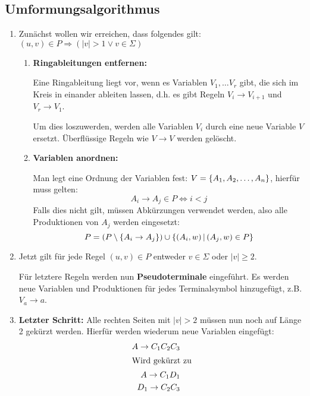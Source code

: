 \subsection{Umformungsalgorithmus}\label{cnf:algorithmus}
\begin{enumerate}
	\item Zunächst wollen wir erreichen, dass folgendes gilt: $(u,v)\in P\Rightarrow (|v|>1 \vee v\in \Sigma)$
	\begin{enumerate}
		\item \textbf{Ringableitungen entfernen:}

		Eine Ringableitung liegt vor, wenn es Variablen $V_1,\ldots V_r$ gibt, die sich im Kreis in einander ableiten lassen, d.h. es gibt Regeln $V_i\rightarrow V_{i+1}$ und $V_r\rightarrow V_1$.

		Um dies loszuwerden, werden alle Variablen $V_i$ durch eine neue Variable $V$ ersetzt. Überflüssige Regeln wie $V\rightarrow V$ werden gelöscht.
		\item \textbf{Variablen anordnen:}

		Man legt eine Ordnung der Variablen fest: $V=\left\{ A_1, A_2, \ldots, A_n \right\}$, hierfür muss gelten:
		\begin{equation*}
			A_i\rightarrow A_j \in P \Leftrightarrow i<j
		\end{equation*}
		Falls dies nicht gilt, müssen Abkürzungen verwendet werden, also alle Produktionen von $A_j$ werden eingesetzt:
		\begin{equation*}
			P=(P\setminus\left\{ A_i\rightarrow A_j \right\})\cup\left\{ (A_i,w) \,\middle|\, (A_j,w)\in P \right\}
		\end{equation*}
	\end{enumerate}
	\item Jetzt gilt für jede Regel $(u,v)\in P$ entweder $v\in\Sigma$ oder $|v|\geq 2$.

	Für letztere Regeln werden nun \textbf{Pseudoterminale} eingeführt. Es werden neue Variablen und Produktionen für jedes Terminalsymbol hinzugefügt, z.B. $V_a\rightarrow a$.

	\item \textbf{Letzter Schritt:} Alle rechten Seiten mit $|v|>2$ müssen nun noch auf Länge 2 gekürzt werden. Hierfür werden wiederum neue Variablen eingefügt:%
	\begin{align*}
		A\rightarrow C_1C_2C_3\\
		\intertext{Wird gekürzt zu}
		A\rightarrow C_1D_1\\
		D_1\rightarrow C_2C_3
	\end{align*}
\end{enumerate}

